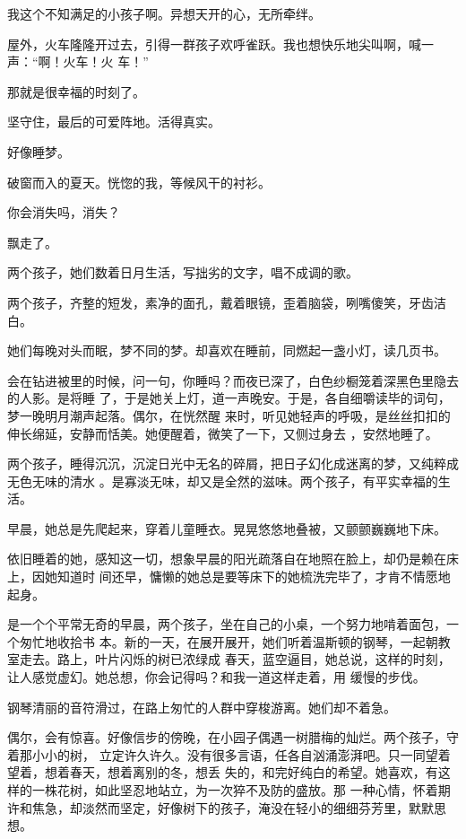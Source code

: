 \documentclass[12pt,a4paper]{article}
\begin{document}
		我这个不知满足的小孩子啊。异想天开的心，无所牵绊。

		屋外，火车隆隆开过去，引得一群孩子欢呼雀跃。我也想快乐地尖叫啊，喊一声：“啊！火车！火
	车！”

		那就是很幸福的时刻了。

		坚守住，最后的可爱阵地。活得真实。

		好像睡梦。

		破窗而入的夏天。恍惚的我，等候风干的衬衫。

		你会消失吗，消失？

		飘走了。

	\endwriting



		两个孩子，她们数着日月生活，写拙劣的文字，唱不成调的歌。

		两个孩子，齐整的短发，素净的面孔，戴着眼镜，歪着脑袋，咧嘴傻笑，牙齿洁白。

		她们每晚对头而眠，梦不同的梦。却喜欢在睡前，同燃起一盏小灯，读几页书。

		会在钻进被里的时候，问一句，你睡吗？而夜已深了，白色纱橱笼着深黑色里隐去的人影。是将睡
	了，于是她关上灯，道一声晚安。于是，各自细嚼读毕的词句，梦一晚明月潮声起落。偶尔，在恍然醒
	来时，听见她轻声的呼吸，是丝丝扣扣的伸长绵延，安静而恬美。她便醒着，微笑了一下，又侧过身去
	，安然地睡了。

		两个孩子，睡得沉沉，沉淀日光中无名的碎屑，把日子幻化成迷离的梦，又纯粹成无色无味的清水
	。是寡淡无味，却又是全然的滋味。两个孩子，有平实幸福的生活。

		早晨，她总是先爬起来，穿着儿童睡衣。晃晃悠悠地叠被，又颤颤巍巍地下床。

		依旧睡着的她，感知这一切，想象早晨的阳光疏落自在地照在脸上，却仍是赖在床上，因她知道时
	间还早，慵懒的她总是要等床下的她梳洗完毕了，才肯不情愿地起身。

		是一个个平常无奇的早晨，两个孩子，坐在自己的小桌，一个努力地啃着面包，一个匆忙地收拾书
	本。新的一天，在展开展开，她们听着温斯顿的钢琴，一起朝教室走去。路上，叶片闪烁的树已浓绿成
	春天，蓝空逼目，她总说，这样的时刻，让人感觉虚幻。她总想，你会记得吗？和我一道这样走着，用
	缓慢的步伐。

		钢琴清丽的音符滑过，在路上匆忙的人群中穿梭游离。她们却不着急。

		偶尔，会有惊喜。好像信步的傍晚，在小园子偶遇一树腊梅的灿烂。两个孩子，守着那小小的树，
	立定许久许久。没有很多言语，任各自汹涌澎湃吧。只一同望着望着，想着春天，想着离别的冬，想丢
	失的，和完好纯白的希望。她喜欢，有这样的一株花树，如此坚忍地站立，为一次猝不及防的盛放。那
	一种心情，怀着期许和焦急，却淡然而坚定，好像树下的孩子，淹没在轻小的细细芬芳里，默默思想。
\end{document}
